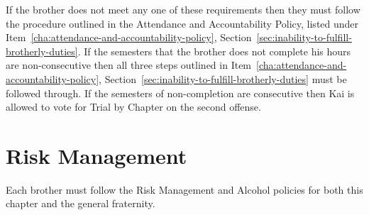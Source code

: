If the brother does not meet any one of these requirements then they must follow
the procedure outlined in the Attendance and Accountability Policy, listed under
Item~\ref{cha:attendance-and-accountability-policy},
Section~\ref{sec:inability-to-fulfill-brotherly-duties}.
If the semesters that the brother does not complete his hours are
non-consecutive then all three steps outlined in
Item~\ref{cha:attendance-and-accountability-policy},
Section~\ref{sec:inability-to-fulfill-brotherly-duties} must be followed
through.
If the semesters of non-completion are consecutive then Kai is allowed to vote
for Trial by Chapter on the second offense.

\section{Risk Management}
\label{risk-management}

Each brother must follow the Risk Management and Alcohol policies for both this
chapter and the general fraternity.

